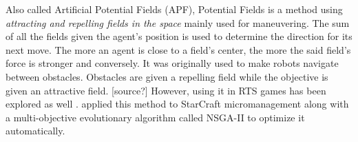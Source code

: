 Also called Artificial Potential Fields (APF), Potential Fields is a method
using \emph{attracting and repelling fields in the space} mainly used for maneuvering.
The sum of all the fields given the agent's position is used to determine the
direction for its next move. The more an agent is close to a field's center,
the more the said field's force is stronger and conversely.
It was originally used to make robots navigate between obstacles. Obstacles are
given a repelling field while the objective is given an attractive field. [source?]
However, using it in RTS games has been explored as well \cite{HaJo08}.
\citet{BoAu12} applied this method to StarCraft micromanagement along with
a multi-objective evolutionary algorithm called NSGA-II to optimize it automatically.

